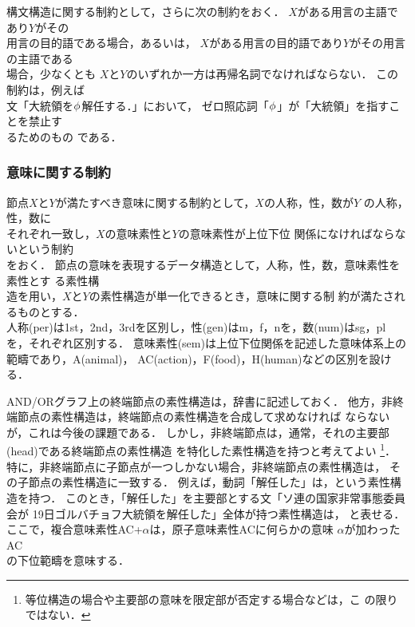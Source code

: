 構文構造に関する制約として，さらに次の制約をおく．
$X$がある用言の主語であり$Y$がその\\用言の目的語である場合，あるいは，
$X$がある用言の目的語であり$Y$がその用言の主語である\\場合，少なくとも
$X$と$Y$のいずれか一方は再帰名詞でなければならない．
この制約は，例えば\\文「大統領を$\phi_{}$解任する．」において，
ゼロ照応詞「$\phi_{}$」が「大統領」を指すことを禁止す\\るためのもの
である．

\subsubsection{意味に関する制約}
\label{sec:twg:corref:sem}

節点$X$\hspace*{-0.1mm}と$Y$\hspace*{-0.1mm}が満たすべき意味に関する制約として，\hspace*{-0.3mm}$X$の人称，\hspace*{-0.1mm}性，\hspace*{-0.1mm}数が$Y$\hspace*{-0.1mm}
の人称，性，数に\\それぞれ一致し，$X$の意味素性と$Y$の意味素性が上位下位
関係になければならないという制約\\をおく．
節点の意味を表現するデータ構造として，人称，性，数，意味素性を素性とす
る素性構\\造を用い，$X$と$Y$の素性構造が単一化できるとき，意味に関する制
約が満たされるものとする．\\
人称(per)は1st，2nd，3rdを区別し，性(gen)はm，f，nを，数(num)はsg，pl
を，それぞれ区別する．
意味素性(sem)は上位下位関係を記述した意味体系上の範疇であり，A(animal)，
AC(action)，F(food)，H(human)などの区別を設ける．

AND/ORグラフ上の終端節点の素性構造は，辞書に記述しておく．
他方，非終端節点の素性構造は，終端節点の素性構造を合成して求めなければ
ならないが，これは今後の課題である．
しかし，非終端節点は，通常，それの主要部(head)である終端節点の素性構造
を特化した素性構造を持つと考えてよい
\footnote{等位構造の場合や主要部の意味を限定部が否定する場合などは，こ
の限りではない．}．
特に，非終端節点に子節点が一つしかない場合，非終端節点の素性構造は，
その子節点の素性構造に一致する．
例えば，動詞「解任した」は，という素性構造を持つ．
このとき，「解任した」を主要部とする文「ソ連の国家非常事態委員会が
19日ゴルバチョフ大統領を解任した」全体が持つ素性構造は，
と表せる．
\hspace{-0.3mm}ここで，\hspace*{-0.3mm}複合意味素性AC+$\alpha$は，\hspace*{-0.3mm}原子意味素性ACに何らかの意味
$\alpha$が加わったAC\\の下位範疇を意味する．

